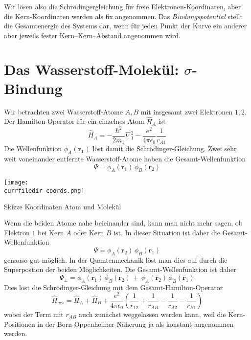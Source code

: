 Wir lösen also die Schrödingergleichung für freie Elektronen-Koordinaten, aber die Kern-Koordinaten werden als fix angenommen. Das \emph{Bindungspotential} stellt die Gesamtenergie des Systems dar, wenn für jeden Punkt der Kurve ein anderer aber jeweils fester Kern--Kern--Abstand angenommen wird.

\section{Das Wasserstoff-Molekül: $\sigma$-Bindung}


Wir betrachten zwei Wasserstoff-Atome $A,B$ mit insgesamt zwei Elektronen $1,2$. Der Hamilton-Operator für ein einzelnes Atom $\hat{H}_A$ ist
\begin{equation}
  \hat{H}_A = - \frac{\hbar^2}{2 m_1} \nabla_1^2 - \frac{e^2}{4 \pi \epsilon_0} \frac{1}{r_{A1}}
\end{equation}
Die Wellenfunktion $\phi_A(\mathbf{r_1})$ löst damit die Schrödinger-Gleichung. Zwei sehr weit voneinander entfernte Wasserstoff-Atome haben die Gesamt-Wellenfunktion
\begin{equation}
 \Psi = \phi_A(\mathbf{r}_1) \, \phi_B(\mathbf{r}_2)
\end{equation}
%
\begin{marginfigure}
\texttt{[image: \\currfiledir coords.png]}
\caption{Skizze Koordinaten Atom und Molekül}
\end{marginfigure}
%
Wenn die beiden Atome nahe beieinander sind, kann man nicht mehr sagen, ob Elektron $1$ bei Kern $A$ oder Kern $B$ ist. In dieser Situation ist daher die Gesamt-Wellenfunktion 
\begin{equation}
 \Psi = \phi_A(\mathbf{r}_2) \, \phi_B(\mathbf{r}_1)
\end{equation}
genauso gut möglich. In der Quantenmechanik löst man dies auf durch die Superpostion der beiden Möglichkeiten. Die Gesamt-Wellenfunktion  ist daher 
\begin{equation}
 \Psi_{\pm} = \phi_A(\mathbf{r}_1) \, \phi_B(\mathbf{r}_2) \, \pm \, \phi_A(\mathbf{r}_2) \, \phi_B(\mathbf{r}_1)
\end{equation}
Dies löst die Schrödinger-Gleichung mit dem Gesamt-Hamilton-Operator
\begin{equation}
  \hat{H}_{ges} =  \hat{H}_A + \hat{H}_B  + \frac{e^2}{4 \pi \epsilon_0} \left( \frac{1}{r_{12}} + \frac{1}{r_{AB}} 
  - \frac{1}{r_{A2}}  - \frac{1}{r_{B1}} 
  \right)
\end{equation}
wobei der Term mit $r_{AB}$ auch zunächst weggelassen werden kann, weil die Kern-Positionen in der Born-Oppenheimer-Näherung ja als konstant angenommen werden.



